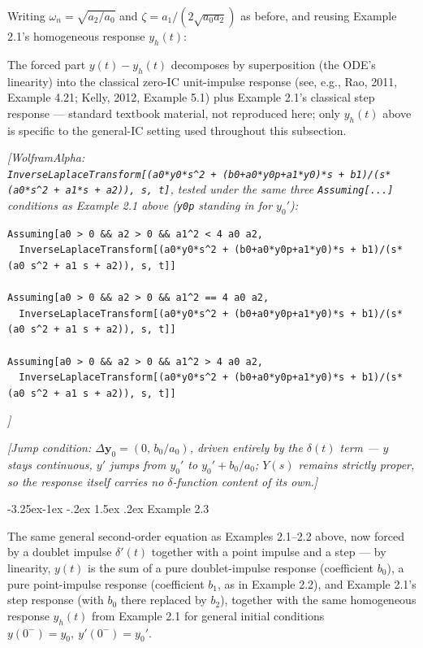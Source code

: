 \documentclass[
  11pt,
]{article}
\makeatletter
\renewcommand\paragraph{\@startsection{paragraph}{4}{\z@}%
                                     {-3.25ex\@plus -1ex \@minus -.2ex}%
                                     {1.5ex \@plus .2ex}%
                                     {\normalfont\normalsize\bfseries}}
\makeatother
\begin{document}
Writing \(\omega_n = \sqrt{a_2/a_0}\) and
\(\zeta = a_1/(2\sqrt{a_0 a_2})\) as before, and reusing Example 2.1's
homogeneous response \(y_h(t)\):

The forced part \(y(t)-y_h(t)\) decomposes by superposition (the ODE's
linearity) into the classical zero-IC unit-impulse response (see, e.g.,
Rao, 2011, Example 4.21; Kelly, 2012, Example 5.1) plus Example 2.1's
classical step response --- standard textbook material, not reproduced
here; only \(y_h(t)\) above is specific to the general-IC setting used
throughout this subsection.

\emph{{[}WolframAlpha:
\texttt{InverseLaplaceTransform{[}(a0*y0*s\^{}2\ +\ (b0+a0*y0p+a1*y0)*s\ +\ b1)/(s*(a0*s\^{}2\ +\ a1*s\ +\ a2)),\ s,\ t{]}},
tested under the same three \texttt{Assuming{[}...{]}} conditions as
Example 2.1 above (\texttt{y0p} standing in for \(y_0'\)):}

\begin{verbatim}
Assuming[a0 > 0 && a2 > 0 && a1^2 < 4 a0 a2,
  InverseLaplaceTransform[(a0*y0*s^2 + (b0+a0*y0p+a1*y0)*s + b1)/(s*(a0 s^2 + a1 s + a2)), s, t]]

Assuming[a0 > 0 && a2 > 0 && a1^2 == 4 a0 a2,
  InverseLaplaceTransform[(a0*y0*s^2 + (b0+a0*y0p+a1*y0)*s + b1)/(s*(a0 s^2 + a1 s + a2)), s, t]]

Assuming[a0 > 0 && a2 > 0 && a1^2 > 4 a0 a2,
  InverseLaplaceTransform[(a0*y0*s^2 + (b0+a0*y0p+a1*y0)*s + b1)/(s*(a0 s^2 + a1 s + a2)), s, t]]
\end{verbatim}

\emph{{]}}

\emph{{[}Jump condition: \(\Delta\mathbf y_0 = (0,\, b_0/a_0)\), driven
entirely by the \(\delta(t)\) term --- \(y\) stays continuous, \(y'\)
jumps from \(y_0'\) to \(y_0'+b_0/a_0\); \(Y(s)\) remains strictly
proper, so the response itself carries no \(\delta\)-function content of
its own.{]}}

\hypertarget{example-2.3}{%
\paragraph{Example 2.3}\label{example-2.3}}

The same general second-order equation as Examples 2.1--2.2 above, now
forced by a doublet impulse \(\delta'(t)\) together with a point impulse
and a step --- by linearity, \(y(t)\) is the sum of a pure
doublet-impulse response (coefficient \(b_0\)), a pure point-impulse
response (coefficient \(b_1\), as in Example 2.2), and Example 2.1's
step response (with \(b_0\) there replaced by \(b_2\)), together with
the same homogeneous response \(y_h(t)\) from Example 2.1 for general
initial conditions \(y(0^-)=y_0,\ y'(0^-)=y_0'\).
\end{document}

